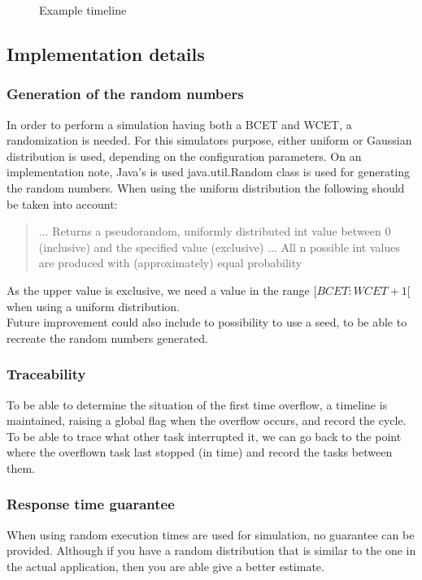 \begin{figure}[h]
\centering
{}
\caption{Example timeline}
\label{fig:example_timeline_output}
\end{figure}

\subsection{Implementation details}
\subsubsection{Generation of the random numbers}
In order to perform a simulation having both a BCET and WCET, a randomization is needed. For this simulators purpose, either uniform or Gaussian distribution is used, depending on the configuration parameters. On an implementation note, Java's is used java.util.Random class is used for generating the random numbers. When using the uniform distribution the following should be taken into account:

\begin{quotation}
... Returns a pseudorandom, uniformly distributed int value between 0 (inclusive) and the specified value (exclusive) ... All n possible int values are produced with (approximately) equal probability\cite{javadoc16}
\end{quotation}

As the upper value is exclusive, we need a value in the range $[BCET:WCET+1[$ when using a uniform distribution.\\
Future improvement could also include to possibility to use a seed, to be able to recreate the random numbers generated.

\subsubsection{Traceability}
To be able to determine the situation of the first time overflow, a timeline is maintained, raising a global flag when the overflow occurs, and record the cycle.\\
To be able to trace what other task interrupted it, we can go back to the point where the overflown task last stopped (in time) and record the tasks between them.

\subsubsection{Response time guarantee}
When using random execution times are used for simulation, no guarantee can be provided. Although if you have a random distribution that is similar to the one in the actual application, then you are able give a better estimate.\\

